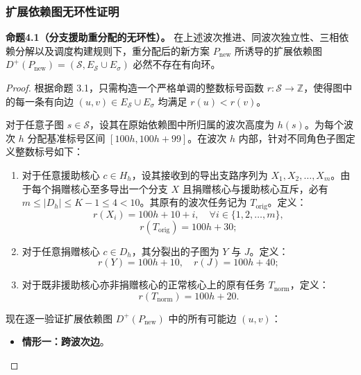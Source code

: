 \documentclass[anonymous,withtoc]{gmcm2026}
\providecommand{\tightlist}{\setlength{\itemsep}{0pt}\setlength{\parskip}{0pt}}
\begin{document}
\subsubsection{扩展依赖图无环性证明}

\textbf{命题4.1（分支援助重分配的无环性）。} 在上述波次推进、同波次独立性、三相依赖分解以及调度构建规则下，重分配后的新方案 \(P_{\mathrm{new}}\) 所诱导的扩展依赖图 \(D^+(P_{\mathrm{new}}) = (\mathcal{S}, E_{\mathcal{S}} \cup E_\sigma)\) 必然不存在有向环。

\begin{proof} 根据命题 3.1，只需构造一个严格单调的整数标号函数 \(r: \mathcal{S} \to \mathbb{Z}\)，使得图中的每一条有向边 \((u, v) \in E_{\mathcal{S}} \cup E_\sigma\) 均满足 \(r(u) < r(v)\)。

对于任意子图 \(s \in \mathcal{S}\)，设其在原始依赖图中所归属的波次高度为 \(h(s)\)。为每个波次 \(h\) 分配基准标号区间 \([100h, 100h + 99]\)。在波次 \(h\) 内部，针对不同角色子图定义整数标号如下：

\begin{enumerate}
\def\labelenumi{\arabic{enumi}.}
\tightlist
\item
  对于任意援助核心 \(c \in H_h\)，设其接收到的导出支路序列为 \(X_1, X_2, \dots, X_m\)。由于每个捐赠核心至多导出一个分支 \(X\) 且捐赠核心与援助核心互斥，必有 \(m \le |D_h| \le K - 1 \le 4 < 10\)。其原有的波次任务记为 \(T_{\mathrm{orig}}\)。定义： \begin{equation}
r(X_i) = 100h + 10 + i, \quad \forall i \in \{1, 2, \dots, m\},
\end{equation} \begin{equation}
r(T_{\mathrm{orig}}) = 100h + 30;
\end{equation}
\item
  对于任意捐赠核心 \(c \in D_h\)，其分裂出的子图为 \(Y\) 与 \(J\)。定义： \begin{equation}
r(Y) = 100h + 10, \quad r(J) = 100h + 40;
\end{equation}
\item
  对于既非援助核心亦非捐赠核心的正常核心上的原有任务 \(T_{\mathrm{norm}}\)，定义： \begin{equation}
r(T_{\mathrm{norm}}) = 100h + 20.
\end{equation}
\end{enumerate}

现在逐一验证扩展依赖图 \(D^+(P_{\mathrm{new}})\) 中的所有可能边 \((u, v)\)：

\begin{itemize}
\tightlist
\item
  \textbf{情形一：跨波次边}。


\end{itemize}
\end{proof}
\end{document}

